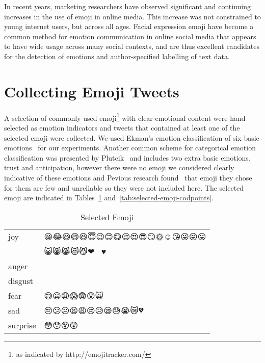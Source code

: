 \documentclass[10pt, a4paper]{article}
\begin{document}
In recent years, marketing researchers have observed significant and continuing increases in the use of emoji in online media. This increase was not constrained to young internet users, but across all ages. 
Facial expression emoji have become a common method for emotion communication in online social media that appears to have wide usage across many social contexts, and are thus excellent candidates for the detection of emotions and author-specified labelling of text data.


\section{Collecting Emoji Tweets}
A selection of commonly used emoji\footnote{as indicated by http://emojitracker.com/} with clear emotional content were hand selected as emotion indicators and tweets that contained at least one of the selected emoji were collected. We used Ekman's emotion classification of six basic emotions~\cite{Ekman1992Argument} for our experiments.
Another common scheme for categorical emotion classification was presented by Plutcik~\cite{plutchik1980general} and includes two extra basic emotions, trust and anticipation, however
there were no emoji we considered clearly indicative of these emotions and Pevious research found~\cite{Suttles2013Distant} that emoji they chose for them are few and unreliable so they were not included here.
The selected emoji are indicated in Tables~\ref{tab:selected-emoji} and~\ref{tab:selected-emoji-codpoints}.

\begin{table}
	\begin{tabular}{ll}
		joy & 😀😂😃😄😆😇😉😊😋😌😍😎😏🌞☺😘😜😝😛 \\
		& 😺😸😹😻😼❤💖💕😁♥ \\
		anger & 😬😠😐😑😠😡😖😤😾 \\
		disgust & 💩 \\
		fear & 😅😦😧😱😨😰🙀 \\
		sad & 😔😕☹😫😩😢😥😪😓😭😿💔 \\
		surprise & 😳😯😵😲 \\
	\end{tabular}
	\caption{Selected Emoji}
	\label{tab:selected-emoji}
\end{table}
\end{document}
